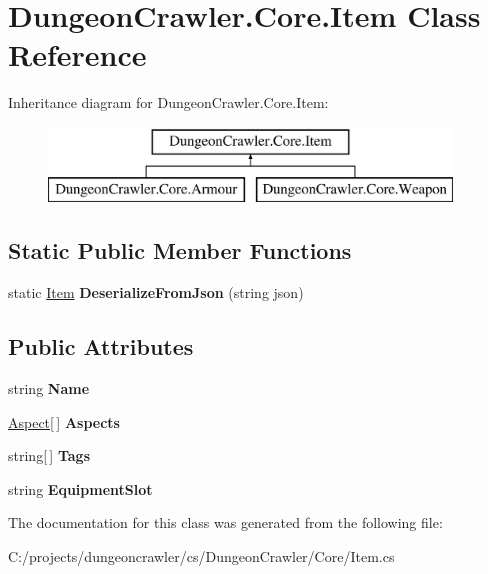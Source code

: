 \hypertarget{class_dungeon_crawler_1_1_core_1_1_item}{}\section{Dungeon\+Crawler.\+Core.\+Item Class Reference}
\label{class_dungeon_crawler_1_1_core_1_1_item}
Inheritance diagram for Dungeon\+Crawler.\+Core.\+Item\+:\begin{figure}[H]
\begin{center}
\leavevmode
\includegraphics[height=2.000000cm]{class_dungeon_crawler_1_1_core_1_1_item}
\end{center}
\end{figure}
\subsection*{Static Public Member Functions}
\begin{DoxyCompactItemize}
\item 
\hypertarget{class_dungeon_crawler_1_1_core_1_1_item_a22c805fd74054dc453cc8710b7b0a023}{}static \hyperlink{class_dungeon_crawler_1_1_core_1_1_item}{Item} {\bfseries Deserialize\+From\+Json} (string json)\label{class_dungeon_crawler_1_1_core_1_1_item_a22c805fd74054dc453cc8710b7b0a023}

\end{DoxyCompactItemize}
\subsection*{Public Attributes}
\begin{DoxyCompactItemize}
\item 
\hypertarget{class_dungeon_crawler_1_1_core_1_1_item_ab24f9d839ae3b24d3dbbceffa8617764}{}string {\bfseries Name}\label{class_dungeon_crawler_1_1_core_1_1_item_ab24f9d839ae3b24d3dbbceffa8617764}

\item 
\hypertarget{class_dungeon_crawler_1_1_core_1_1_item_af11c39625f65ca6261e749a9d4119c61}{}\hyperlink{class_dungeon_crawler_1_1_core_1_1_aspect}{Aspect}\mbox{[}$\,$\mbox{]} {\bfseries Aspects}\label{class_dungeon_crawler_1_1_core_1_1_item_af11c39625f65ca6261e749a9d4119c61}

\item 
\hypertarget{class_dungeon_crawler_1_1_core_1_1_item_a9b5424ecb05cba5b5e96db05de4bf71e}{}string\mbox{[}$\,$\mbox{]} {\bfseries Tags}\label{class_dungeon_crawler_1_1_core_1_1_item_a9b5424ecb05cba5b5e96db05de4bf71e}

\item 
\hypertarget{class_dungeon_crawler_1_1_core_1_1_item_a6d0c7b4ba5b26317ec7b5491f0f03501}{}string {\bfseries Equipment\+Slot}\label{class_dungeon_crawler_1_1_core_1_1_item_a6d0c7b4ba5b26317ec7b5491f0f03501}

\end{DoxyCompactItemize}


The documentation for this class was generated from the following file\+:\begin{DoxyCompactItemize}
\item 
C\+:/projects/dungeoncrawler/cs/\+Dungeon\+Crawler/\+Core/Item.\+cs\end{DoxyCompactItemize}
